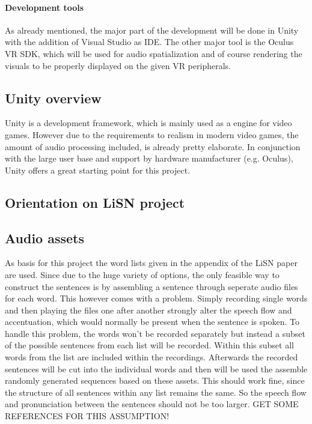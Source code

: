 \documentclass[a4paper,11pt]{article}%
\renewcommand{\\}{\vspace*{0.5\baselineskip} \newline}
\begin{document}
\paragraph{Development tools} As already mentioned, the major part of the development will be done in Unity with the addition of Visual Studio as IDE. The other major tool is the Oculus VR SDK, which will be used for audio spatialization and of course rendering the visuals to be properly displayed on the given VR peripherals.



\subsection{Unity overview}
\label{sec:unity}
Unity is a development framework, which is mainly used as a engine for video games. However due to the requirements to realism in modern video games, the amount of audio processing included, is already pretty elaborate. In conjunction with the large user base and support by hardware manufacturer (e.g. Oculus), Unity offers a great starting point for this project.


\subsection{Orientation on LiSN project}


\subsection{Audio assets}
\label{sec:audio_assets}
As basis for this project the word lists given in the appendix of the LiSN paper \cite{lins} are used. Since due to the huge variety of options, the only feasible way to construct the sentences is by assembling a sentence through seperate audio files for each word. This however comes with a problem. Simply recording single words and then playing the files one after another strongly alter the speech flow and accentuation, which would normally be present when the sentence is spoken.
\newline
\newline
To handle this problem, the words won't be recorded separately but instead a subset of the possible sentences from each list will be recorded. Within this subset all words from the list are included within the recordings. Afterwards the recorded sentences will be cut into the individual words and then will be used the assemble randomly generated sequences based on these assets. This should work fine, since the structure of all sentences within any list remains the same. So the speech flow and pronunciation between the sentences should not be too larger. GET SOME REFERENCES FOR THIS ASSUMPTION!
\end{document}
